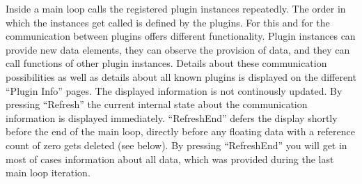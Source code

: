 Inside a main loop \icewing{} calls the registered plugin instances
repeatedly. The order in which the instances get called is defined
by the plugins. For this and for the communication between plugins
\icewing{} offers different functionality. Plugin instances can
provide new data elements, they can observe the provision of data,
and they can call functions of other plugin instances. Details about
these communication possibilities as well as details about all known
plugins is displayed on the different ``Plugin Info'' pages.
The displayed information is not continously updated. By pressing
``Refresh'' the current internal state about the communication
information is displayed immediately. ``RefreshEnd'' defers the
display shortly before the end of the main loop, directly before any
floating data with a reference count of zero gets deleted (see
below). By pressing ``RefreshEnd'' you will get in most of cases
information about all data, which was provided during the last main
loop iteration.

